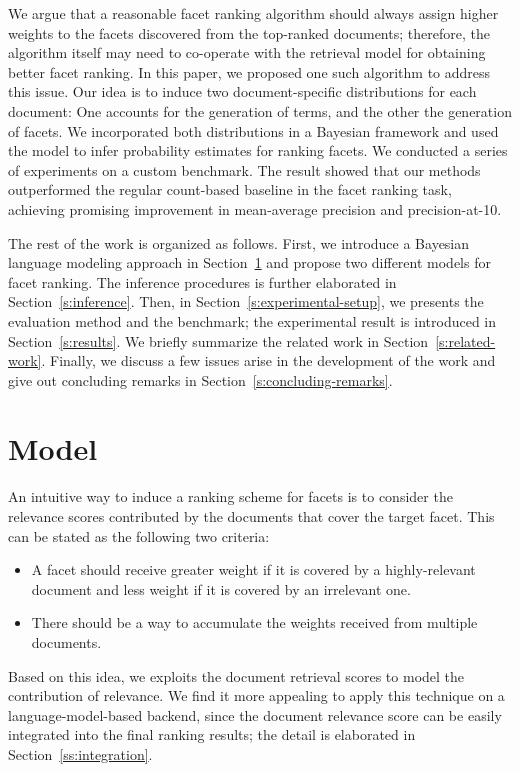 We argue that a reasonable facet ranking algorithm should always assign higher
weights to the facets discovered from the top-ranked documents; therefore, the
algorithm itself may need to co-operate with the retrieval model for obtaining
better facet ranking.  In this paper, we proposed one such algorithm to address
this issue.  Our idea is to induce two document-specific distributions for each
document: One accounts for the generation of terms, and the other the
generation of facets.  We incorporated both distributions in a Bayesian
framework and used the model to infer probability estimates for ranking facets.
We conducted a series of experiments on a custom benchmark.  The result showed
that our methods outperformed the regular count-based baseline in the facet
ranking task, achieving promising improvement in mean-average precision and
precision-at-10. 

The rest of the work is organized as follows.  First, we introduce a Bayesian language
modeling approach in Section~\ref{s:model} and propose two different models for
facet ranking.  The inference procedures is further elaborated in
Section~\ref{s:inference}.  Then, in Section~\ref{s:experimental-setup}, we presents the
evaluation method and the benchmark; the experimental result is introduced in
Section~\ref{s:results}.  We briefly summarize the related work in
Section~\ref{s:related-work}.  Finally, we discuss a few issues arise in the
development of the work and give out concluding remarks in
Section~\ref{s:concluding-remarks}.

\section{Model}\label{s:model}

An intuitive way to induce a ranking scheme for facets is to consider the
relevance scores contributed by the documents that cover the target facet.
This can be stated as the following two criteria: \begin{itemize} \item A facet
should receive greater weight if it is covered by a highly-relevant document and
less weight if it is covered by an irrelevant one. \item There
should be a way to accumulate the weights received from multiple documents.
\end{itemize} Based on this idea, we exploits the document retrieval scores to
model the contribution of relevance.  We find it more appealing to apply this
technique on a language-model-based backend, since the document relevance score
can be easily integrated into the final ranking results; the detail is
elaborated in Section~\ref{ss:integration}.

